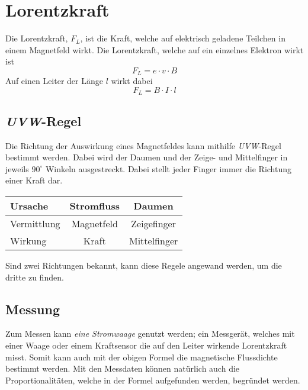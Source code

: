 \documentclass{article}
\begin{document}
 
\section{Lorentzkraft}
Die Lorentzkraft, $F_L$, ist die Kraft, welche auf elektrisch geladene Teilchen in einem Magnetfeld wirkt.
Die Lorentzkraft, welche auf ein einzelnes Elektron wirkt ist
\[
 F_L = e \cdot v \cdot B
\] 
Auf einen Leiter der Länge $l$ wirkt dabei
\[
 F_L = B \cdot I \cdot l
\]
 
\subsection{\emph{UVW}-Regel} 
Die Richtung der Auswirkung eines Magnetfeldes kann mithilfe \emph{UVW}-Regel bestimmt werden. Dabei wird der Daumen und der Zeige- und Mittelfinger in jeweils $90^\circ$ Winkeln ausgestreckt. Dabei stellt jeder Finger immer die Richtung einer Kraft dar.
\begin{center}
\begin{tabular}{ |l|c|c| }
\hline
 \colorbox{red!30}{U}rsache & Stromfluss & Daumen \\
\hline
 \colorbox{red!30}{V}ermittlung & Magnetfeld & Zeigefinger \\
\hline
 \colorbox{red!30}{W}irkung & Kraft & Mittelfinger \\
\hline
\end{tabular}
\end{center}
Sind zwei Richtungen bekannt, kann diese Regele angewand werden, um die dritte zu finden.
 
\subsection{Messung} 
\begin{minipage}{\dimexpr\linewidth-5cm} 
Zum Messen kann \emph{eine Stromwaage} genutzt werden; ein Messgerät, welches mit einer Waage oder einem Kraftsensor die auf den Leiter wirkende Lorentzkraft misst. Somit kann auch mit der obigen Formel die magnetische Flussdichte bestimmt werden. \newline
Mit den Messdaten können natürlich auch die Proportionalitäten, welche in der Formel aufgefunden werden, begründet werden.
\end{minipage} 
\hfill
\begin{minipage}{5cm}
 \center
\end{minipage} 
\end{document}
